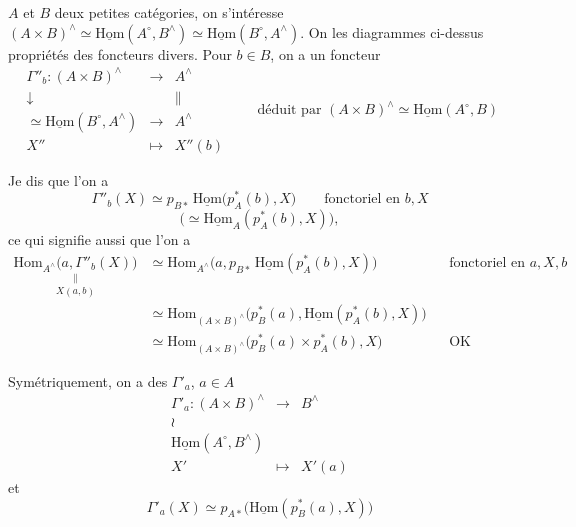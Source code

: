\documentclass[11pt,a4paper]{article}
\begin{document}
$A$ et $B$ deux petites catégories, on s'intéresse 
  $(A \times B)^{\wedge} \simeq
\underline{\mathrm{Hom}}(A^{\circ}, B^{\wedge}) \simeq
\underline{\mathrm{Hom}}(B^{\circ}, A^{\wedge})$. On \ill{} \ill{} \ill{}
les diagrammes ci-dessus  propriétés des foncteurs
\ill{} divers. Pour $b \in B$, on a un foncteur
\[
\begin{array}{ccc}
\Gamma''_b : (A \times B)^{\wedge} & \longrightarrow & A^{\wedge}\\
\downarrow & & \|\\
\simeq \underline{\mathrm{Hom}}(B^{\circ}, A^{\wedge}) & \longrightarrow & A^{\wedge}\\
X'' & \longmapsto & X''(b)
\end{array}
\qquad \text{déduit par } (A \times B)^{\wedge} \simeq
\underline{\mathrm{Hom}}(A^{\circ}, B)
\]

Je dis que l'on a
\[
\Gamma''_b(X) \simeq p_{B*}\, \underline{\mathrm{Hom}}\bigl(p_A^{*}(b), X\bigr)
\qquad \text{fonctoriel en } b, X
\]
\[
\bigl(\simeq \underline{\mathrm{Hom}}_A(p_A^{*}(b), X)\bigr),
\]
ce qui signifie aussi que l'on a
\[
\begin{aligned}
\underset{X(a, b)}{\underset{\|}{\mathrm{Hom}_{A^{\wedge}}\bigl(a, \Gamma''_b(X)\bigr)}}
&\simeq \mathrm{Hom}_{A^{\wedge}}\bigl(a, p_{B*}\, \underline{\mathrm{Hom}}(p_A^{*}(b), X)\bigr)
&&\text{fonctoriel en } a, X, b\\
&\simeq \mathrm{Hom}_{(A \times B)^{\wedge}}\bigl(p_B^{*}(a), \underline{\mathrm{Hom}}(p_A^{*}(b), X)\bigr)\\
&\simeq \mathrm{Hom}_{(A \times B)^{\wedge}}\bigl(p_B^{*}(a) \times p_A^{*}(b), X\bigr)
&&\text{OK}
\end{aligned}
\]


Symétriquement, on a des $\Gamma'_a$, $a \in A$
\[
\begin{array}{ccc}
\Gamma'_a : (A \times B)^{\wedge} & \longrightarrow & B^{\wedge}\\
\wr & &\\
\underline{\mathrm{Hom}}(A^{\circ}, B^{\wedge}) & &\\
X' & \longmapsto & X'(a)
\end{array}
\]
et 
\[
\Gamma'_a(X) \simeq p_{A*}\bigl(\underline{\mathrm{Hom}}(p_B^{*}(a), X)\bigr)
\]
\end{document}
